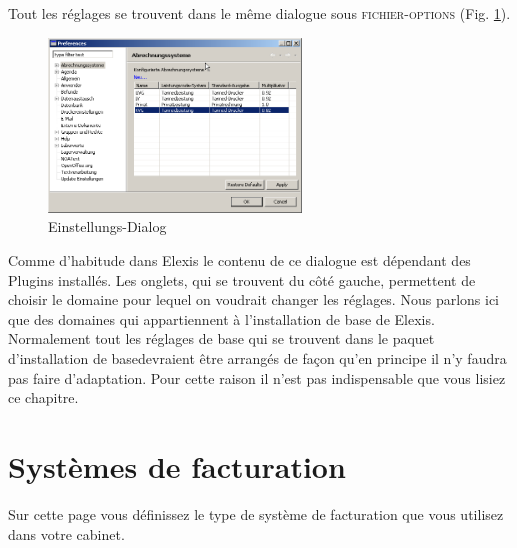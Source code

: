 %

\label{settings}
Tout les réglages se trouvent dans le même dialogue sous \textsc{fichier-options}  (Fig. \ref{fig:settingsmain}).
\begin{figure}[h]
\begin{center}
  \includegraphics[width=0.6\textwidth]{images/settingsmain}
  \caption{Einstellungs-Dialog}
  \label{fig:settingsmain}
\end{center}
\end{figure}


Comme d'habitude dans Elexis le contenu de ce dialogue est dépendant des Plugins installés. Les onglets, qui se trouvent du côté gauche, permettent de choisir le domaine pour lequel on voudrait changer les réglages. Nous parlons ici que des domaines qui appartiennent à l'installation de base de Elexis. Normalement tout les réglages de base qui se trouvent dans le  \glqq paquet d'installation de base\grqq{}devraient être arrangés de façon qu'en principe il n'y faudra pas faire d'adaptation. Pour cette raison il n'est pas indispensable que vous lisiez ce chapitre.

\section{Systèmes de facturation}
\label{settings:abrechnungssystem}
Sur cette page vous définissez le type de système de facturation que vous utilisez dans votre cabinet. 

